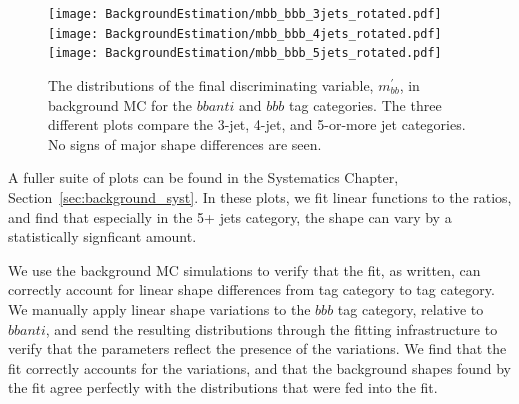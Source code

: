 
\begin{figure}[hbt]
\center
\texttt{[image: BackgroundEstimation/mbb\_bbb\_3jets\_rotated.pdf]}
\texttt{[image: BackgroundEstimation/mbb\_bbb\_4jets\_rotated.pdf]}
\texttt{[image: BackgroundEstimation/mbb\_bbb\_5jets\_rotated.pdf]}
\caption{The distributions of the final discriminating variable, $m_{bb}^{'}$, 
in background MC for the $bbanti$ and $bbb$ tag categories.  The three different plots
compare the 3-jet, 4-jet, and 5-or-more jet categories.  No signs of major shape
differences are seen.
\label{fig:bkg_shape_compare}}
\end{figure}

A fuller suite of plots can be found in the Systematics Chapter, Section~\ref{sec:background_syst}.
In these plots, we fit linear functions to the ratios, and find that especially in the 
5+ jets category, the shape can vary by a statistically signficant amount.  

We use the background MC simulations to verify that the fit, as written, can correctly
account for linear shape differences from tag category to tag category.  We manually apply
linear shape variations to the $bbb$ tag category, relative to $bbanti$, and send the 
resulting distributions through the fitting infrastructure to verify that the parameters
reflect the presence of the variations.  We find that the fit correctly accounts for the 
variations, and that the background shapes found by the fit agree perfectly with the distributions
that were fed into the fit.






 




